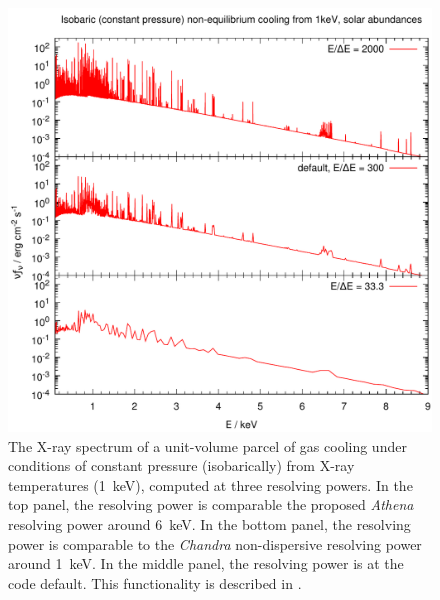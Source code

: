 \begin{figure}
	\centering
	\includegraphics[scale=0.9]{cooling-flow-spectrum-hazy1}
	\caption[Cooling flow]
	{	\label{fig:coolingFlow}
		The X-ray spectrum of a unit-volume parcel of gas cooling under conditions
		of constant pressure (isobarically) from X-ray temperatures (1~keV), computed
		at three resolving powers.
		In the top panel, the resolving power is comparable the proposed {\it Athena}
		resolving power around 6~keV.
		In the bottom panel, the resolving power is comparable to the {\it Chandra}
		non-dispersive resolving power around 1~keV.
		In the middle panel, the resolving power is at the code default.
		This functionality is described in \citet{Chatzikos2015}.
	}
\end{figure}


